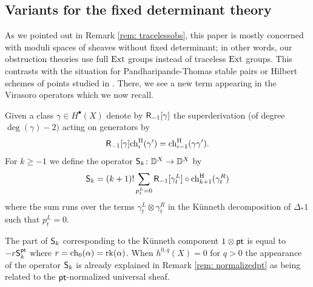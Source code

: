 \documentclass[a4paper, 12pt]{amsart}
\begin{document}
\subsection{Variants for the fixed determinant theory}
\label{sec: fixeddet}

As we pointed out in Remark \ref{rem: tracelessobs}, this paper is mostly concerned with moduli spaces of sheaves without fixed determinant; in other words, our obstruction theories use full $\textup{Ext}$ groups instead of traceless $\textup{Ext}$ groups. This contrasts with the situation for Pandharipande-Thomas stable pairs or Hilbert schemes of points studied in \cite{moreira}. There, we see a new term appearing in the Virasoro operators which we now recall.

\begin{definition}
Given a class $\gamma\in H^\bullet(X)$ denote by $\mathsf{R}_{-1}[\gamma]$ the superderivation (of degree $\deg(\gamma)-2)$ acting on generators by
\[\mathsf{R}_{-1}[\gamma]\mathrm{ch}^{\mathrm{H}}_i(\gamma')=\mathrm{ch}^{\mathrm{H}}_{i-1}(\gamma \gamma').\]
For $k\geq -1$ we define the operator ${\mathsf{S}}_k\colon {\mathbb{D}}^X\to {\mathbb{D}}^X$ by
\[{\mathsf{S}}_k=(k+1)!\sum_{p_t^L=0}\mathsf{R}_{-1}[\gamma_t^L]\circ\mathrm{ch}^{\mathrm{H}}_{k+1}(\gamma_t^R)\]
where the sum runs over the terms $\gamma_t^L\otimes\gamma_t^R$ in the K\"unneth decomposition of $\Delta_\ast 1$ such that $p_t^L=0$.
\end{definition}
\begin{remark}
The part of ${\mathsf{S}}_k$ corresponding to the K\"unneth component $1\otimes {\mathsf{pt}}$ is equal to $-r{\mathsf{S}}_k^{\mathsf{pt}}$ where $r=\mathrm{ch}_0(\alpha)=\mathrm{rk}(\alpha)$. When $h^{0, q}(X)=0$ for $q>0$ the appearance of the operator ${\mathsf{S}}_k$ is already explained in Remark \ref{rem: normalizedpt} as being related to the ${\mathsf{pt}}$-normalized universal sheaf. 
\end{remark}
\end{document}
